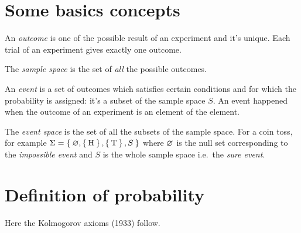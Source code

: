 \documentclass[
	10pt,
	draft
]{scrreprt}
\begin{document}
	\section{Some basics concepts}

An \emph{outcome} is one of the possible result of an experiment and it's unique.
Each trial of an experiment gives exactly one outcome.


The \emph{sample space} is the set of \emph{all} the possible outcomes.



An \emph{event} is a set of outcomes which satisfies certain conditions and for which the probability is assigned: it's a subset of the sample space $S$.
An event happened when the outcome of an experiment is an element of the element.




The \emph{event space} is the set of all the subsets of the sample space.
For a coin toss, for example $\Sigma = \Set{\ensuremath{\varnothing},\Set{\text{H}},\Set{\text{T}}, S}$ where $\varnothing$ is the null set corresponding to the \emph{impossible event} and $S$ is the whole sample space i.e.~the \emph{sure event}.

	\section{Definition of probability}

Here the Kolmogorov axioms (1933) follow.
\end{document}
